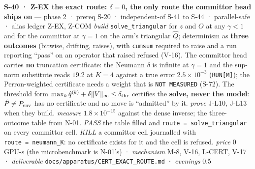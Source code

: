 \documentclass[11pt,a4paper]{article}
\theoremstyle{plain}
\theoremstyle{definition}
\theoremstyle{remark}
\begin{document}
\textbf{S-40 · Z-EX the exact route: \(\delta=0\), the only route the
committor head ships on} --- phase 2 · prereq S-20 · independent-of S-41
to S-44 · parallel-safe · alias ledger Z-EX, Z-COM \emph{build}
\texttt{solve\_triangular} for \(z\) and \(O\) at any \(\gamma<1\) and
for the committor at \(\gamma=1\) on the arm's triangular \(\hat Q\);
determinism as \textbf{three outcomes} (bitwise, drifting, raises), with
\texttt{cumsum} required to raise and a run reporting ``pass'' on an
operator that raised refused (V-16). The committor head carries
\textbf{no} truncation certificate: the Neumann \(\delta\) is infinite
at \(\gamma=1\) and the sup-norm substitute reads \(19.2\) at \(K=4\)
against a true error \(2.5\times10^{-3}\) (\texttt{RUN{[}M{]}}); the
Perron-weighted certificate needs a weight that is
\texttt{NOT\ MEASURED} (S-72). The threshold form
\(\max_k\hat q^{(k)}+\delta\|V\|_\infty\le\delta_{\rm thr}\) certifies
the \textbf{solve, never the model}: \(\hat P\ne P_{\rm env}\) has no
certificate and no move is ``admitted'' by it. \emph{prove} J-L10, J-L13
when they build. \emph{measure} \(1.8\times10^{-15}\) against the dense
inverse; the three-outcome table from N-01. \emph{PASS} the table filled
and \texttt{route\ =\ solve\_triangular} on every committor cell.
\emph{KILL} a committor cell journalled with
\texttt{route\ =\ neumann\_K}: no certificate exists for it and the cell
is refused. \emph{price} \(0\) GPU-s (the microbenchmark is N-01's) ·
\emph{mechanism} M-8, V-16, L-CERT, V-17 · \emph{deliverable}
\texttt{docs/apparatus/CERT\_EXACT\_ROUTE.md} · \emph{evenings} 0.5
\end{document}
